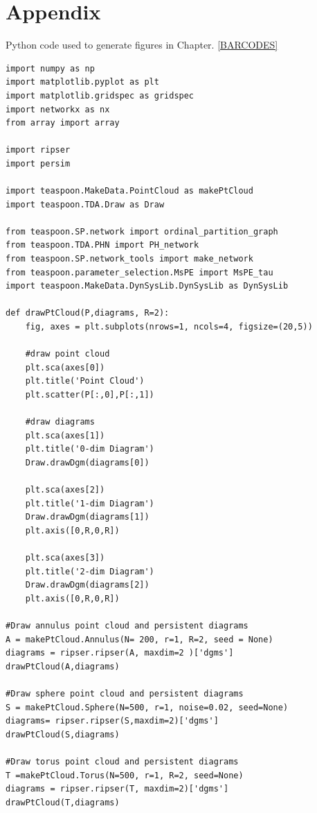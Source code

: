 \documentclass{article}
\begin{document}
\section{Appendix}
Python code used to generate figures in Chapter. \ref{BARCODES}
\begin{lstlisting}
import numpy as np
import matplotlib.pyplot as plt
import matplotlib.gridspec as gridspec
import networkx as nx
from array import array

import ripser
import persim

import teaspoon.MakeData.PointCloud as makePtCloud
import teaspoon.TDA.Draw as Draw

from teaspoon.SP.network import ordinal_partition_graph
from teaspoon.TDA.PHN import PH_network
from teaspoon.SP.network_tools import make_network
from teaspoon.parameter_selection.MsPE import MsPE_tau
import teaspoon.MakeData.DynSysLib.DynSysLib as DynSysLib

def drawPtCloud(P,diagrams, R=2):
    fig, axes = plt.subplots(nrows=1, ncols=4, figsize=(20,5))
    
    #draw point cloud
    plt.sca(axes[0])
    plt.title('Point Cloud')
    plt.scatter(P[:,0],P[:,1])
    
    #draw diagrams
    plt.sca(axes[1])
    plt.title('0-dim Diagram')
    Draw.drawDgm(diagrams[0])
    
    plt.sca(axes[2])
    plt.title('1-dim Diagram')
    Draw.drawDgm(diagrams[1])
    plt.axis([0,R,0,R])
    
    plt.sca(axes[3])
    plt.title('2-dim Diagram')
    Draw.drawDgm(diagrams[2])
    plt.axis([0,R,0,R])

#Draw annulus point cloud and persistent diagrams
A = makePtCloud.Annulus(N= 200, r=1, R=2, seed = None)
diagrams = ripser.ripser(A, maxdim=2 )['dgms']
drawPtCloud(A,diagrams)

#Draw sphere point cloud and persistent diagrams
S = makePtCloud.Sphere(N=500, r=1, noise=0.02, seed=None)
diagrams= ripser.ripser(S,maxdim=2)['dgms']
drawPtCloud(S,diagrams)

#Draw torus point cloud and persistent diagrams
T =makePtCloud.Torus(N=500, r=1, R=2, seed=None)
diagrams = ripser.ripser(T, maxdim=2)['dgms']
drawPtCloud(T,diagrams)
\end{lstlisting}

\printbibliography[heading = bibintoc,title = {References}]
\end{document}
